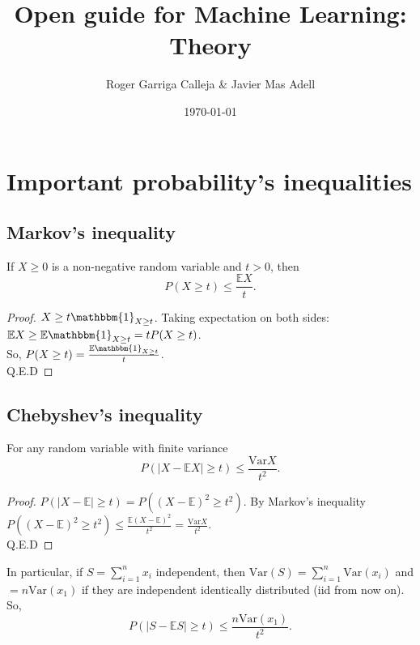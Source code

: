 \documentclass[11pt, english]{article}
\title{Open guide for Machine Learning: Theory}
\author{Roger Garriga Calleja \& Javier Mas Adell}
\date{\today}
\newcommand{\su}[2]{\sum\limits_{#1}^{#2}}
\begin{document}
\maketitle

\section{Important probability's inequalities}

\subsection*{Markov's inequality}

If $X\geq 0$ is a non-negative random variable and $t>0$, then
\begin{equation}
	P(X\geq t)\leq \frac{\mathbb{E}X}{t}.
\end{equation}
\begin{proof}
	$X\geq t\mathbbm{1}_{X\geq t}$. Taking expectation on both sides: $\mathbb{E}X\geq \mathbb{E}\mathbbm{1}_{X\geq t}=tP(X\geq t)$. \\ So, $P(X\geq t)=\frac{\mathbb{E}\mathbbm{1}_{X\geq t}}{t}$. \\ Q.E.D
\end{proof}

\subsection*{Chebyshev's inequality}

For any random variable with finite variance
\begin{equation}
	P(|X-\mathbb{E}X|\geq t)\leq \frac{\text{Var} X}{t^2}.
\end{equation}

\begin{proof}
	$P(|X-\mathbb{E}|\geq t)=P((X-\mathbb{E})^2\geq t^2)$. By Markov's inequality $P((X-\mathbb{E})^2\geq t^2)\leq \frac{\mathbb{E}(X-\mathbb{E})^2}{t^2}=\frac{\text{Var} X}{t^2}$.\\
	Q.E.D
\end{proof}

In particular, if $S=\su{i=1}{n} x_i$ independent, then $\text{Var}(S)=\sum\limits_{i=1}^n \text{Var}(x_i)$ and $=n\text{Var}(x_1)$ if they are independent identically distributed (iid from now on). So,
\begin{equation}
	P(|S-\mathbb{E} S|\geq t)\leq \frac{n\text{Var}(x_1)}{t^2}.
\end{equation}
\end{document}
